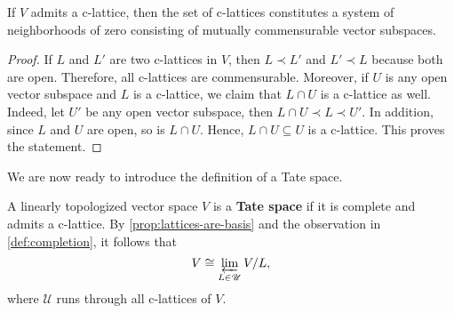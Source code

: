 \begin{proposition}\label{prop:lattices-are-basis}
	If $V$ admits a c-lattice, then the set of c-lattices constitutes a system of neighborhoods of zero consisting of mutually commensurable vector subspaces.
\end{proposition}
\begin{proof}
	If $L$ and $L'$ are two c-lattices in $V$, then $L \prec L'$ and $L' \prec L$ because both are open. Therefore, all c-lattices are commensurable. Moreover, if $U$ is any open vector subspace and $L$ is a c-lattice, we claim that $L \cap U$ is a c-lattice as well. Indeed, let $U'$ be any open vector subspace, then $L\cap U \prec L\prec U'$. In addition, since $L$ and $U$ are open, so is $L \cap U$. Hence, $L \cap U \subseteq U$ is a c-lattice. This proves the statement.
\end{proof}
We are now ready to introduce the definition of a Tate space.
\begin{definition}\label{def:tate-vector-space}
	A linearly topologized vector space $V$ is a \textbf{Tate space} if it is complete and admits a c-lattice. By \cref{prop:lattices-are-basis} and the observation in \cref{def:completion}, it follows that
	\[
		V \cong \varprojlim_{L \in \mathscr{U}} V/L,
	\]
	where $\mathscr{U}$ runs through all c-lattices of $V$.
\end{definition}
